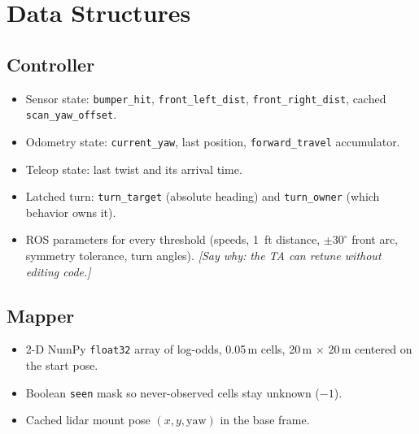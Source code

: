 \documentclass[11pt]{article}
\newcommand{\prompt}[1]{\textit{[#1]}}
\begin{document}
\section{Data Structures}
\subsection{Controller}
\begin{itemize}
  \item Sensor state: \texttt{bumper\_hit}, \texttt{front\_left\_dist},
        \texttt{front\_right\_dist}, cached \texttt{scan\_yaw\_offset}.
  \item Odometry state: \texttt{current\_yaw}, last position,
        \texttt{forward\_travel} accumulator.
  \item Teleop state: last twist and its arrival time.
  \item Latched turn: \texttt{turn\_target} (absolute heading) and
        \texttt{turn\_owner} (which behavior owns it).
  \item ROS parameters for every threshold (speeds, 1~ft distance,
        $\pm30^\circ$ front arc, symmetry tolerance, turn angles).
        \prompt{Say why: the TA can retune without editing code.}
\end{itemize}

\subsection{Mapper}
\begin{itemize}
  \item 2-D NumPy \texttt{float32} array of log-odds, 0.05\,m cells,
        20\,m $\times$ 20\,m centered on the start pose.
  \item Boolean \texttt{seen} mask so never-observed cells stay unknown
        ($-1$).
  \item Cached lidar mount pose $(x, y, \text{yaw})$ in the base frame.
\end{itemize}

\end{document}
